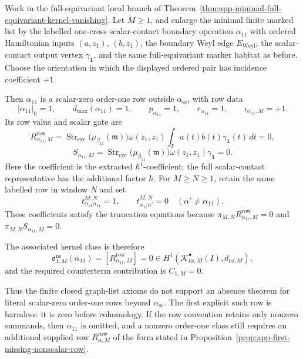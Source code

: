 \begin{prop}
\label{prop:app-first-scalar-zero-order-one-row}
  Work in the full-equivariant local branch of
  Theorem~\ref{thm:app-minimal-full-equivariant-kernel-vanishing}.  Let
  \(M\geq1\), and enlarge the minimal finite marked list by the labelled
  one-cross scalar-contact boundary operation
  \(\alpha_{11}\) with ordered Hamiltonian inputs
  \((a,z_1)\), \((b,z_1)\), the boundary Weyl edge \(E_{\mathrm{Weyl}}\),
  the scalar-contact output vertex \(\gamma_{\mathbf 1}\), and the same
  full-equivariant marker habitat as before.  Choose the orientation in
  which the displayed ordered pair has incidence coefficient \(+1\).

  Then \(\alpha_{11}\) is a scalar-zero order-one row outside
  \(\alpha_{\mathrm{sc}}\), with row data
  \[
    |\alpha_{11}|_\hbar=1,\qquad
    d_{\max}(\alpha_{11})=1,\qquad
    p_{\alpha_{11}}=1,\qquad
    r_{\alpha_{11}}=1,\qquad
    \iota_{\alpha_{11},M}=+1.
  \]
  Its row value and scalar gate are
  \[
    R^{\mathrm{row}}_{\alpha_{11},M}
      =
    \operatorname{Str}_{\mathrm{cyc}}
      \bigl(\mu_{\beta_{11}}(\mathfrak m)\bigr)
    \omega(z_1,z_1)
    \int_I a(t)b(t)\gamma_{\mathbf 1}(t)\,dt
      =0,
  \]
  \[
    S_{\alpha_{11},M}
      =
    \operatorname{Str}_{\mathrm{cyc}}
      \bigl(\mu_{\beta_{11}}(\mathfrak m)\bigr)
    \omega(z_1,z_1)\gamma_{\mathbf 1}=0.
  \]
  Here the coefficient is the extracted \(\hbar^1\)-coefficient; the full
  scalar-contact representative has the additional factor \(\hbar\).
  For \(M\geq N\geq1\), retain the same labelled row in window \(N\) and
  set
  \[
    t^{M,N}_{\alpha_{11}\alpha_{11}}=1,\qquad
    t^{M,N}_{\alpha_{11}\alpha'}=0
    \quad(\alpha'\neq\alpha_{11}).
  \]
  These coefficients satisfy the truncation equations because
  \(\pi_{M,N}R^{\mathrm{row}}_{\alpha_{11},M}=0\) and
  \(\pi_{M,N}S_{\alpha_{11},M}=0\).

  The associated kernel class is therefore
  \[
    \mathfrak o^{\mathrm{ns}}_{1,M}(\alpha_{11})
      =
    [R^{\mathrm{row}}_{\alpha_{11},M}]
      =
    0
    \in H^1\!\left(
      \mathcal K^\bullet_{\mathrm{ns},M}(I),d_{\mathrm{ns},M}
    \right),
  \]
  and the required counterterm contribution is \(C_{1,M}=0\).

  Thus the finite closed graph-list axioms do not support an absence
  theorem for literal scalar-zero order-one rows beyond
  \(\alpha_{\mathrm{sc}}\).  The first explicit such row is harmless:
  it is zero before cohomology.  If the row convention retains only
  nonzero summands, then \(\alpha_{11}\) is omitted, and a nonzero
  order-one class still requires an additional supplied row
  \(R^{\mathrm{row}}_{\alpha,M}\) of the form stated in
  Proposition~\ref{prop:app-first-missing-nonscalar-row}.
\end{prop}


